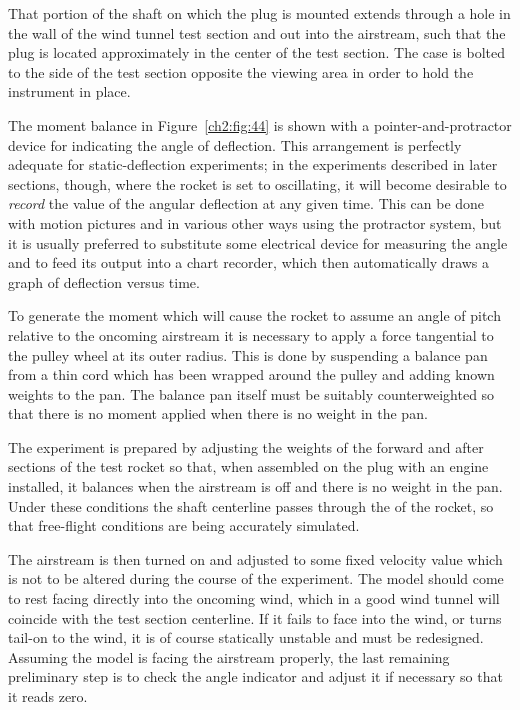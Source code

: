 That portion of the shaft on which the plug is mounted extends through a hole
in the wall of the wind tunnel test section and out into the airstream, such
that the plug is located approximately in the center of the test section. The
case is bolted to the side of the test section opposite the viewing area in
order to hold the instrument in place.

The moment balance in Figure~\ref{ch2:fig:44} is shown with a
pointer-and-protractor device for indicating the angle of deflection. This
arrangement is perfectly adequate for static-deflection experiments; in the
experiments described in later sections, though, where the rocket is set to
oscillating, it will become desirable to \emph{record} the value of the
angular deflection at any given time. This can be done with motion pictures
and in various other ways using the protractor system, but it is usually
preferred to substitute some electrical device for measuring the angle and to
feed its output into a chart recorder, which then automatically draws a graph
of deflection versus time.

To generate the moment which will cause the rocket to assume an angle of pitch
relative to the oncoming airstream it is necessary to apply a force tangential
to the pulley wheel at its outer radius. This is done by suspending a balance
pan from a thin cord which has been wrapped around the pulley and adding known
weights to the pan. The balance pan itself must be suitably counterweighted so
that there is no moment applied when there is no weight in the pan.

The experiment is prepared by adjusting the weights of the forward and after
sections of the test rocket so that, when assembled on the plug with an engine
installed, it balances when the airstream is off and there is no weight in the
pan. Under these conditions the shaft centerline passes through the \CG{} of
the rocket, so that free-flight conditions are being accurately simulated.

The airstream is then turned on and adjusted to some fixed velocity value
which is not to be altered during the course of the experiment. The model
should come to rest facing directly into the oncoming wind, which in a good
wind tunnel will coincide with the test section centerline. If it fails to
face into the wind, or turns tail-on to the wind, it is of course statically
unstable and must be redesigned. Assuming the model is facing the airstream
properly, the last remaining preliminary step is to check the angle indicator
and adjust it if necessary so that it reads zero.

